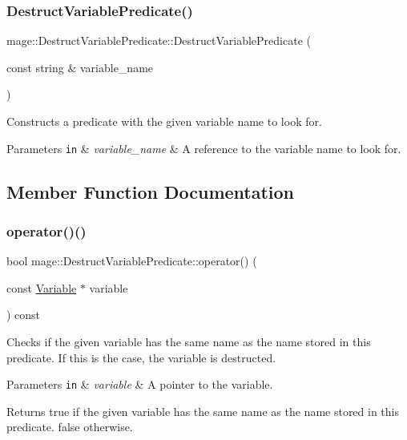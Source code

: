\subsubsection{\texorpdfstring{Destruct\+Variable\+Predicate()}{DestructVariablePredicate()}}
{\footnotesize\ttfamily mage\+::\+Destruct\+Variable\+Predicate\+::\+Destruct\+Variable\+Predicate (\begin{DoxyParamCaption}\item[{const string \&}]{variable\+\_\+name }\end{DoxyParamCaption})}

Constructs a predicate with the given variable name to look for.


\begin{DoxyParams}[1]{Parameters}
\mbox{\tt in}  & {\em variable\+\_\+name} & A reference to the variable name to look for. \\
\hline
\end{DoxyParams}


\subsection{Member Function Documentation}
\hypertarget{structmage_1_1_destruct_variable_predicate_ad75df157dde6e4ba34810cb035a7bc74}{}\label{structmage_1_1_destruct_variable_predicate_ad75df157dde6e4ba34810cb035a7bc74} 
\subsubsection{\texorpdfstring{operator()()}{operator()()}}
{\footnotesize\ttfamily bool mage\+::\+Destruct\+Variable\+Predicate\+::operator() (\begin{DoxyParamCaption}\item[{const \hyperlink{structmage_1_1_variable}{Variable} $\ast$}]{variable }\end{DoxyParamCaption}) const}

Checks if the given variable has the same name as the name stored in this predicate. If this is the case, the variable is destructed.


\begin{DoxyParams}[1]{Parameters}
\mbox{\tt in}  & {\em variable} & A pointer to the variable. \\
\hline
\end{DoxyParams}
\begin{DoxyReturn}{Returns}
{\ttfamily true} if the given variable has the same name as the name stored in this predicate. {\ttfamily false} otherwise. 
\end{DoxyReturn}


